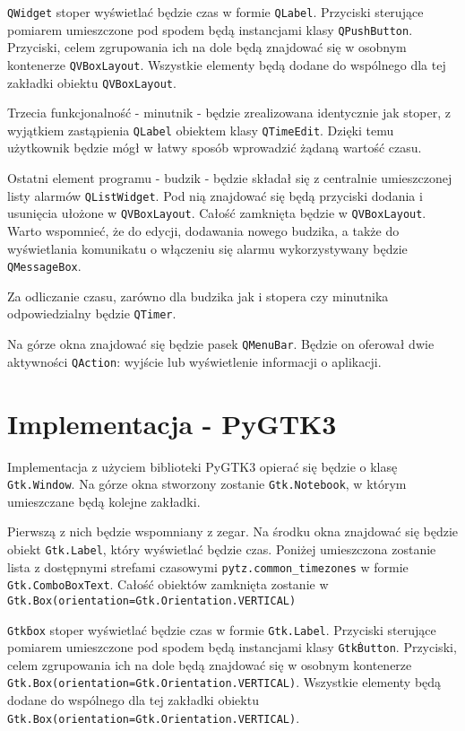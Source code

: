 \documentclass[11pt]{article}
\begin{document}
    \texttt{QWidget} stoper wyświetlać będzie czas w formie \texttt{QLabel}. Przyciski sterujące
    pomiarem umieszczone pod spodem będą instancjami klasy \texttt{QPushButton}. Przyciski, celem
    zgrupowania ich na dole będą znajdować się w osobnym kontenerze \texttt{QVBoxLayout}. Wszystkie
    elementy będą dodane do wspólnego dla tej zakładki obiektu \texttt{QVBoxLayout}.

    Trzecia funkcjonalność - minutnik - będzie zrealizowana identycznie jak stoper, z wyjątkiem
    zastąpienia \texttt{QLabel} obiektem klasy \texttt{QTimeEdit}. Dzięki temu użytkownik będzie mógł
    w łatwy sposób wprowadzić żądaną wartość czasu.

    Ostatni element programu - budzik - będzie składał się z centralnie umieszczonej listy alarmów
    \texttt{QListWidget}. Pod nią znajdować się będą przyciski dodania i usunięcia ułożone w
    \texttt{QVBoxLayout}. Całość zamknięta będzie w \texttt{QVBoxLayout}. Warto wspomnieć, że do edycji,
    dodawania nowego budzika, a także do wyświetlania komunikatu o włączeniu się alarmu wykorzystywany będzie
    \texttt{QMessageBox}.

    Za odliczanie czasu, zarówno dla budzika jak i stopera czy minutnika odpowiedzialny będzie \texttt{QTimer}.

    Na górze okna znajdować się będzie pasek \texttt{QMenuBar}. Będzie on oferował dwie aktywności \texttt{QAction}:
    wyjście lub wyświetlenie informacji o aplikacji.

    \section{Implementacja - PyGTK3}
    Implementacja z użyciem biblioteki PyGTK3 opierać się będzie o klasę \texttt{Gtk.Window}.
    Na górze okna stworzony zostanie \texttt{Gtk.Notebook}, w którym umieszczane będą kolejne zakładki.

    Pierwszą z nich będzie wspomniany z zegar. Na środku okna znajdować się będzie obiekt \texttt{Gtk.Label},
    który wyświetlać będzie czas. Poniżej umieszczona zostanie lista z dostępnymi strefami czasowymi 
    \texttt{pytz.common\_timezones} w formie \texttt{Gtk.ComboBoxText}. Całość obiektów zamknięta zostanie
    w \texttt{Gtk.Box(orientation=Gtk.Orientation.VERTICAL)}

    \texttt{Gtk\.box} stoper wyświetlać będzie czas w formie \texttt{Gtk.Label}. Przyciski sterujące
    pomiarem umieszczone pod spodem będą instancjami klasy \texttt{Gtk\.Button}. Przyciski, celem
    zgrupowania ich na dole będą znajdować się w osobnym kontenerze
    \texttt{Gtk.Box(orientation=Gtk.Orientation.VERTICAL)}. Wszystkie
    elementy będą dodane do wspólnego dla tej zakładki obiektu
    \texttt{Gtk.Box(orientation=Gtk.Orientation.VERTICAL)}.
\end{document}
